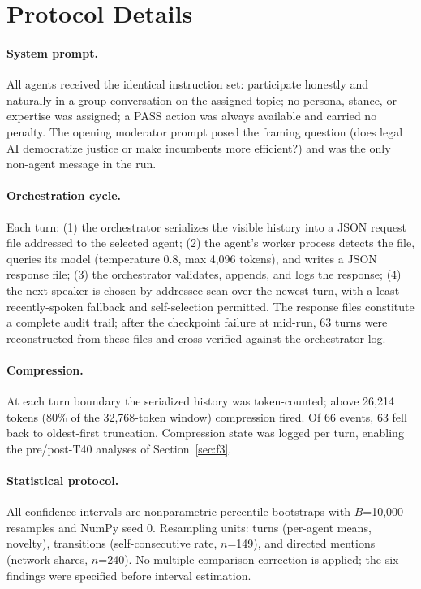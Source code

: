 \documentclass[sigconf,nonacm=true]{acmart}
\begin{document}
\appendix

\section{Protocol Details}
\label{app:protocol}

\paragraph{System prompt.} All agents received the identical instruction set: participate honestly and naturally in a group conversation on the assigned topic; no persona, stance, or expertise was assigned; a PASS action was always available and carried no penalty. The opening moderator prompt posed the framing question (does legal AI democratize justice or make incumbents more efficient?) and was the only non-agent message in the run.

\paragraph{Orchestration cycle.} Each turn: (1) the orchestrator serializes the visible history into a JSON request file addressed to the selected agent; (2) the agent's worker process detects the file, queries its model (temperature 0.8, max 4{,}096 tokens), and writes a JSON response file; (3) the orchestrator validates, appends, and logs the response; (4) the next speaker is chosen by addressee scan over the newest turn, with a least-recently-spoken fallback and self-selection permitted. The response files constitute a complete audit trail; after the checkpoint failure at mid-run, 63 turns were reconstructed from these files and cross-verified against the orchestrator log.

\paragraph{Compression.} At each turn boundary the serialized history was token-counted; above 26{,}214 tokens (80\% of the 32{,}768-token window) compression fired. Of 66 events, 63 fell back to oldest-first truncation. Compression state was logged per turn, enabling the pre/post-T40 analyses of Section~\ref{sec:f3}.

\paragraph{Statistical protocol.} All confidence intervals are nonparametric percentile bootstraps with $B$=10{,}000 resamples and NumPy seed 0. Resampling units: turns (per-agent means, novelty), transitions (self-consecutive rate, $n$=149), and directed mentions (network shares, $n$=240). No multiple-comparison correction is applied; the six findings were specified before interval estimation.
\end{document}
